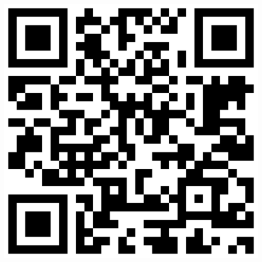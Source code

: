 \documentclass{yalcv}
\begin{document}
\begin{cvsidebar}
    \begin{cvsidebarbox}[b]
        \includegraphics[width=0.35\currentwidth]{qrcode}
    \end{cvsidebarbox}
\end{cvsidebar}%

\newpage%
\end{document}
